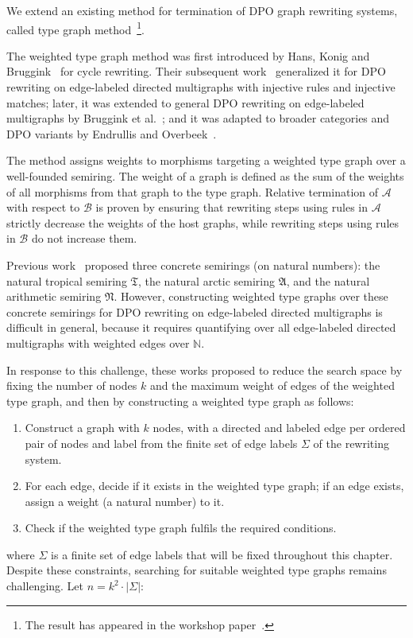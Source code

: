 We extend an existing method for termination of DPO graph rewriting systems, called type graph method~\footnote{The result has appeared in the workshop paper~\cite{qiu2025termination_nwf_v2_acceptedgcm}.}.

The weighted type graph method was first introduced by Hans, Konig and Bruggink~\cite{zantema2014termination} for cycle rewriting. Their subsequent work~\cite{bruggink2014termination} generalized it for DPO rewriting on edge-labeled directed multigraphs with injective rules and injective matches; later, it was extended to general DPO rewriting on edge-labeled multigraphs by Bruggink et al.~\cite{bruggink2015proving}; and it was adapted to broader categories and DPO variants by Endrullis and Overbeek~\cite{endrullis2024generalized_icgt}. 

The method assigns weights to morphisms targeting a weighted type graph over a well-founded semiring. The weight of a graph is defined
 as the sum of the weights of all morphisms from that graph to the type graph. Relative termination of $\mathcal{A}$ with respect to $\mathcal{B}$ is proven by ensuring that rewriting steps using rules in \( \mathcal{A} \) strictly decrease the weights of the host graphs, while rewriting steps using rules in \( \mathcal{B} \) do not increase them.
    
   Previous work~\cite{zantema2014termination,bruggink2014termination,bruggink2015proving} proposed three concrete semirings (on natural numbers): the natural tropical semiring $\mathfrak{T}$, the natural arctic semiring $\mathfrak{A}$, and the natural arithmetic semiring $\mathfrak{N}$.
    However, constructing weighted type graphs over these concrete semirings for DPO rewriting on edge-labeled directed multigraphs is difficult in general, because it requires quantifying over all edge-labeled directed multigraphs with weighted edges over $\mathbb{N}$.

    In response to this challenge, these works proposed to reduce the search space by fixing the number of nodes \( k\) and the maximum weight of edges of the weighted type graph, and then by constructing a weighted type graph as follows: 
    \begin{enumerate}
      \item Construct a graph with \( k \) nodes, with a directed and labeled edge per ordered pair of nodes and label from the finite set of edge labels $\Sigma$ of the rewriting system. 
      \item For each edge, decide if it exists in the weighted type graph;  if an edge exists, assign a weight (a natural number) to it.
      \item Check if the weighted type graph fulfils the required conditions.
    \end{enumerate}
    where $\Sigma$ is a finite set of edge labels that will be fixed throughout this chapter.
    Despite these constraints, searching for suitable weighted type graphs
    remains challenging. 
    Let $n \mathop{=} k^2 \cdot | \Sigma |$:
    

